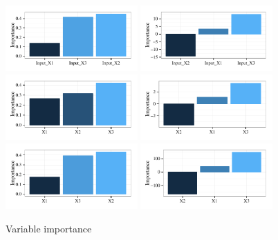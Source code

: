 \documentclass[article,shortnames]{jss}\usepackage[]{graphicx}\usepackage[]{color}
\begin{document}
\begin{figure}[!ht]
{\centering \includegraphics[width=0.45\textwidth]{figs/plotimp-1} 
\includegraphics[width=0.45\textwidth]{figs/plotimp-2} 
\includegraphics[width=0.45\textwidth]{figs/plotimp-3} 
\includegraphics[width=0.45\textwidth]{figs/plotimp-4} 
\includegraphics[width=0.45\textwidth]{figs/plotimp-5} 
\includegraphics[width=0.45\textwidth]{figs/plotimp-6} 

}

\caption[Variable importance]{Variable importance}\label{fig:plotimp}
\end{figure}
\end{document}
